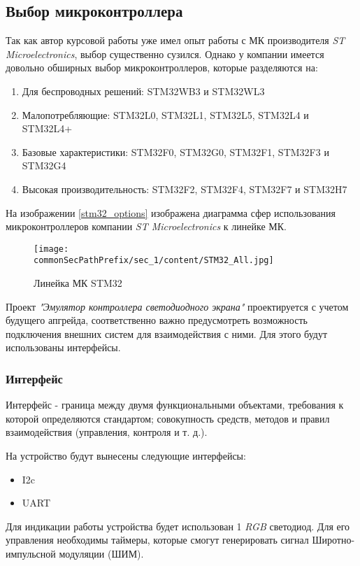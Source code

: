 \subsection{Выбор микроконтроллера}

Так как автор курсовой работы уже имел опыт работы с МК производителя \textit{ST Microelectronics}, выбор существенно сузился. Однако у компании имеется довольно обширных выбор микроконтроллеров, которые разделяются на:
\begin{enumerate}
    \item Для беспроводных решений: STM32WB3 и STM32WL3
    \item Малопотребляющие:  STM32L0, STM32L1,  STM32L5, STM32L4 и STM32L4+
    \item Базовые характеристики: STM32F0, STM32G0, STM32F1, STM32F3 и STM32G4
    \item Высокая производительность: STM32F2, STM32F4, STM32F7 и STM32H7   
\end{enumerate}

На изображении \ref{stm32_options} изображена диаграмма сфер использования микроконтроллеров компании \textit{ST Microelectronics} к линейке МК.
\begin{figure}[ht]
    \centering
    \texttt{[image: \\commonSecPathPrefix/sec\_1/content/STM32\_All.jpg]}
    \caption{Линейка МК STM32}
    \label{fig:stm32_options}
\end{figure}

Проект \textit{"Эмулятор контроллера светодиодного экрана"} проектируется с учетом будущего апгрейда, соответственно важно предусмотреть возможность подключения внешних систем для взаимодействия с ними. Для этого будут использованы интерфейсы.

\subsubsection{Интерфейс}

Интерфейс - граница между двумя функциональными объектами, требования к которой определяются стандартом; совокупность средств, методов и правил взаимодействия (управления, контроля и т. д.).

На устройство будут вынесены следующие интерфейсы:
\begin{itemize}
    \item I2c
    \item UART
\end{itemize}

Для индикации работы устройства будет использован 1 \textit{RGB} светодиод. Для его управления необходимы таймеры, которые смогут генерировать сигнал Широтно-импульсной модуляции (ШИМ).

